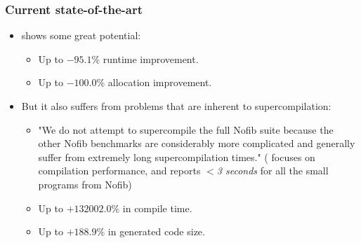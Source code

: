 \documentclass{beamer}
\begin{document}
\begin{frame}
    \frametitle{Current state-of-the-art}

    \begin{itemize}
        \item
            \citet{callbyneed-sc} shows some great potential:
            \begin{itemize}
                \item
                    Up to $-95.1\%$ runtime improvement.
                \item
                    Up to $-100.0\%$ allocation improvement.
            \end{itemize}
        \item
            But it also suffers from problems that are inherent to
            supercompilation:
            \begin{itemize}
                \item
                    "We do not attempt to supercompile the full Nofib suite because the
                    other Nofib benchmarks are considerably more complicated and
                    generally suffer from extremely long supercompilation times."
                    \newline
                    (\citet{timeandspace} focuses on compilation performance,
                    and reports \textit{$<$3 seconds} for all the small programs
                    from Nofib)
                \item
                    Up to $+132002.0\%$ in compile time.
                \item
                    Up to $+188.9\%$ in generated code size.
            \end{itemize}
    \end{itemize}
\end{frame}
\end{document}
